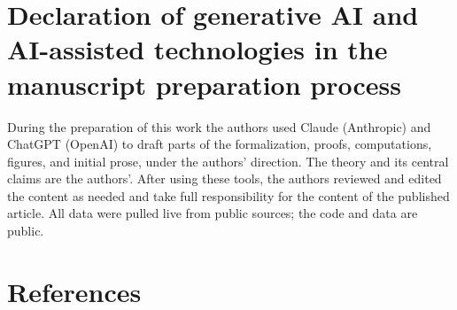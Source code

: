 \documentclass[12pt]{article}
\theoremstyle{plain}
\begin{document}
\section*{Declaration of generative AI and AI-assisted technologies in the manuscript preparation process}

During the preparation of this work the authors used Claude (Anthropic) and ChatGPT (OpenAI) to draft parts of the formalization, proofs, computations, figures, and initial prose, under the authors' direction. The theory and its central claims are the authors'. After using these tools, the authors reviewed and edited the content as needed and take full responsibility for the content of the published article. All data were pulled live from public sources; the code and data are public.

\section*{References}
\end{document}
